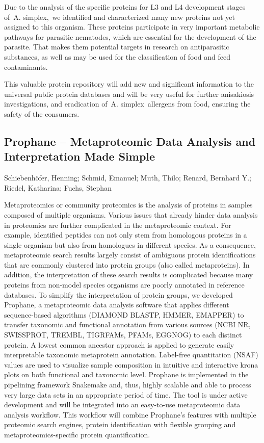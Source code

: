 {Due to the analysis of the specific proteins for L3 and L4 development stages of A. simplex, we identified and characterized many new proteins not yet assigned to this organism. These proteins participate in very important metabolic pathways for parasitic nematodes, which are essential for the development of the parasite. That makes them potential targets in research on antiparasitic substances, as well as may be used for the classification of food and feed contaminants.

This valuable protein repository will add new and significant information to the universal public protein databases and will be very useful for further anisakiosis investigations, and eradication of A. simplex allergens from food, ensuring the safety of the consumers. 


\subsection*{\color{eubicRed} Prophane -- Metaproteomic Data Analysis and Interpretation Made Simple}
{\color{eubicGray}Schiebenhöfer, Henning;
Schmid, Emanuel;
Muth, Thilo;
Renard, Bernhard Y.;
Riedel, Katharina;
Fuchs, Stephan}

Metaproteomics or community proteomics is the analysis of proteins in samples composed of multiple organisms. Various issues that already hinder data analysis in proteomics are further complicated in the metaproteomic context. For example, identified peptides can not only stem from homologous proteins in a single organism but also from homologues in different species. As a consequence, metaproteomic search results largely consist of ambiguous protein identifications that are commonly clustered into protein groups (also called metaproteins). In addition, the interpretation of these search results is complicated because many proteins from non-model species organisms are poorly annotated in reference databases. To simplify the interpretation of protein groups, we developed Prophane, a metaproteomic data analysis software that applies different sequence-based algorithms (DIAMOND BLASTP, HMMER, EMAPPER) to transfer taxonomic and functional annotation from various sources (NCBI NR, SWISSPROT, TREMBL, TIGRFAMs, PFAMs, EGGNOG) to each distinct protein. A lowest common ancestor approach is applied to generate easily interpretable taxonomic metaprotein annotation. Label-free quantitation (NSAF) values are used to visualize sample composition in intuitive and interactive krona plots on both functional and taxonomic level. Prophane is implemented in the pipelining framework Snakemake and, thus, highly scalable and able to process very large data sets in an appropriate period of time. The tool is under active development and will be integrated into an easy-to-use metaproteomic data analysis workflow. This workflow will combine Prophane’s features with multiple proteomic search engines, protein identification with flexible grouping and metaproteomics-specific protein quantification.


}

